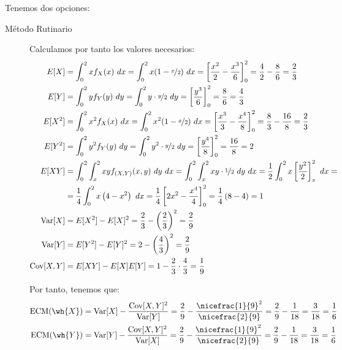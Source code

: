 \begin{ejercicio}
\begin{enumerate}
        Tenemos dos opciones:
        \begin{description}
            \item[Método Rutinario] Calculamos por tanto los valores necesarios:
            \begin{align*}
                E[X] &= \int_{0}^{2} x f_X(x) \ dx = \int_{0}^{2} x(1-\nicefrac{x}{2}) \ dx
                = \left[\dfrac{x^2}{2} - \dfrac{x^3}{6}\right]_{0}^{2}
                = \dfrac{4}{2} - \dfrac{8}{6} = \dfrac{2}{3}\\
                E[Y] &= \int_{0}^{2} y f_Y(y) \ dy = \int_{0}^{2} y\cdot \nicefrac{y}{2} \ dy
                = \left[\dfrac{y^3}{6}\right]_{0}^{2} = \dfrac{8}{6} = \frac{4}{3}\\
                E[X^2] &= \int_{0}^{2} x^2 f_X(x) \ dx = \int_{0}^{2} x^2(1-\nicefrac{x}{2}) \ dx
                = \left[\dfrac{x^3}{3} - \dfrac{x^4}{8}\right]_{0}^{2}
                = \dfrac{8}{3} - \dfrac{16}{8} = \dfrac{2}{3}\\
                E[Y^2] &= \int_{0}^{2} y^2 f_Y(y) \ dy = \int_{0}^{2} y^2\cdot \nicefrac{y}{2} \ dy
                = \left[\dfrac{y^4}{8}\right]_{0}^{2} = \dfrac{16}{8} = 2\\
                E[XY] &= \int_{0}^{2} \int_{x}^{2} xy f_{(X,Y)}(x, y) \ dy \ dx
                = \int_{0}^{2} \int_{x}^{2} xy\cdot \nicefrac{1}{2} \ dy \ dx
                = \frac{1}{2} \int_{0}^{2} x\left[\dfrac{y^2}{2}\right]_{x}^{2} \ dx
                =\\&= \frac{1}{4} \int_{0}^{2} x\left(4 - x^2\right) \ dx
                = \frac{1}{4} \left[2x^2 - \frac{x^4}{4}\right]_{0}^{2}
                = \frac{1}{4} \left(8 - 4\right) = 1\\
                \operatorname{Var}[X] &= E[X^2] - E[X]^2 = \frac{2}{3} - \left(\frac{2}{3}\right)^2 = \frac{2}{9}\\
                \operatorname{Var}[Y] &= E[Y^2] - E[Y]^2 = 2 - \left(\frac{4}{3}\right)^2 = \frac{2}{9}\\
                \operatorname{Cov}[X,Y] &= E[XY] - E[X]E[Y] = 1 - \frac{2}{3}\cdot \frac{4}{3} = \frac{1}{9}
            \end{align*}
    
            Por tanto, tenemos que:
            \begin{align*}
                \text{ECM}(\wh{X}) &= \Var[X] - \dfrac{\Cov[X,Y]^2}{\Var[Y]}
                = \frac{2}{9} - \dfrac{\nicefrac{1}{9}^2}{\nicefrac{2}{9}}
                = \frac{2}{9} - \frac{1}{18} = \frac{3}{18} = \frac{1}{6}\\
                \text{ECM}(\wh{Y}) &= \Var[Y] - \dfrac{\Cov[X,Y]^2}{\Var[X]}
                = \frac{2}{9} - \dfrac{\nicefrac{1}{9}^2}{\nicefrac{2}{9}}
                = \frac{2}{9} - \frac{1}{18} = \frac{3}{18} = \frac{1}{6}
            \end{align*}
            

\end{description}
\end{enumerate}
\end{ejercicio}
